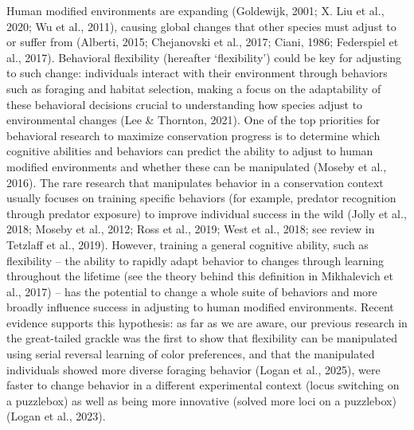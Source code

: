 \documentclass[
]{article}
\begin{document}
Human modified environments are expanding (Goldewijk, 2001; {X. Liu et
al.}, 2020; Wu et al., 2011), causing global changes that other species
must adjust to or suffer from (Alberti, 2015; Chejanovski et al., 2017;
Ciani, 1986; Federspiel et al., 2017). Behavioral flexibility (hereafter
`flexibility') could be key for adjusting to such change: individuals
interact with their environment through behaviors such as foraging and
habitat selection, making a focus on the adaptability of these
behavioral decisions crucial to understanding how species adjust to
environmental changes (Lee \& Thornton, 2021). One of the top priorities
for behavioral research to maximize conservation progress is to
determine which cognitive abilities and behaviors can predict the
ability to adjust to human modified environments and whether these can
be manipulated (Moseby et al., 2016). The rare research that manipulates
behavior in a conservation context usually focuses on training specific
behaviors (for example, predator recognition through predator exposure)
to improve individual success in the wild (Jolly et al., 2018; Moseby et
al., 2012; Ross et al., 2019; West et al., 2018; see review in Tetzlaff
et al., 2019). However, training a general cognitive ability, such as
flexibility -- the ability to rapidly adapt behavior to changes through
learning throughout the lifetime (see the theory behind this definition
in Mikhalevich et al., 2017) -- has the potential to change a whole
suite of behaviors and more broadly influence success in adjusting to
human modified environments. Recent evidence supports this hypothesis:
as far as we are aware, our previous research in the great-tailed
grackle was the first to show that flexibility can be manipulated using
serial reversal learning of color preferences, and that the manipulated
individuals showed more diverse foraging behavior (Logan et al., 2025),
were faster to change behavior in a different experimental context
(locus switching on a puzzlebox) as well as being more innovative
(solved more loci on a puzzlebox) (Logan et al., 2023).
\end{document}
